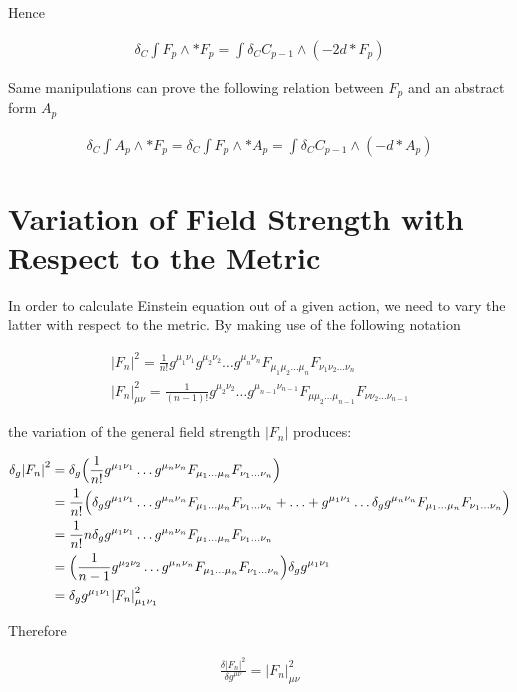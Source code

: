\documentclass[a4paper,notitlepage]{report}
\begin{document}
\vspace{0.5em}
Hence

\begin{align}
\delta_C \int F_p \wedge *F_p = \int \delta_C C_{p-1} \wedge (- 2 d * F_p) 
\end{align}

\vspace{0.5em}
Same manipulations can prove the following relation between $F_p$ and an abstract form $A_p$
 
\begin{align}
\delta_C \int A_p \wedge *F_p = \delta_C \int F_p \wedge *A_p = \int \delta_C C_{p-1} \wedge (-d * A_p) 
\end{align}

\clearpage

\section{Variation of Field Strength with Respect to the Metric} \label{ABC3}

In order to calculate Einstein equation out of a given action, we need to vary the latter with respect to the metric. By making use of the following notation

\begin{gather}
{|{F}_{n}|}^2 = \frac{1}{n!} g^{\mu_{1}\nu_{1}} g^{\mu_{2}\nu_{2}} \ldots g^{\mu_{n}\nu_{n}} {F}_{\mu_{1} \mu_{2} \ldots \mu_{n}} {F}_{\nu_{1} \nu_{2} \ldots \nu_{n}} \\
{|{F}_{n}|}^2_{\mu\nu} =  \frac{1}{(n-1)!} g^{\mu_{2}\nu_{2}} \ldots g^{\mu_{n-1}\nu_{n-1}} {F}_{\mu \mu_{2} \ldots \mu_{n-1}} {F}_{\nu \nu_{2} \ldots \nu_{n-1}}
\end{gather}

the variation of the general field strength $|F_{n}|$ produces:

\begin{align}
\delta_g {|{F}_{n}|}^2 &= \delta_g \Big( \frac{1}{n!} g^{\mu_{1}\nu_{1}} \ldots g^{\mu_{n}\nu_{n}} F_{\mu_{1} \ldots \mu_{n}} F_{\nu_{1} \ldots \nu_{n}} \Big) \notag \\
&= \frac{1}{n!} \Big( \delta_g g^{\mu_{1}\nu_{1}} \ldots g^{\mu_{n}\nu_{n}} F_{\mu_{1} \ldots \mu_{n}} F_{\nu_{1} \ldots \nu_{n}} + \ldots + g^{\mu_{1}\nu_{1}} \ldots \delta_g  g^{\mu_{n}\nu_{n}} F_{\mu_{1} \ldots \mu_{n}} F_{\nu_{1} \ldots \nu_{n}}  \Big) \notag\\
&= \frac{1}{n!} n \delta_g g^{\mu_{1}\nu_{1}} \ldots g^{\mu_{n}\nu_{n}} F_{\mu_{1} \ldots \mu_{n}} F_{\nu_{1} \ldots \nu_{n}} \notag\\
&= \Big( \frac{1}{n-1} g^{\mu_{2}\nu_{2}}  \ldots g^{\mu_{n}\nu_{n}} F_{\mu_{1} \ldots \mu_{n}} F_{\nu_{1} \ldots \nu_{n}} \Big) \delta_g g^{\mu_{1}\nu_{1}} \notag\\
& = \delta_g g^{\mu_{1}\nu_{1}} {|{F}_{n}|}^2_{\mu_{1}\nu_{1}} \notag
\end{align}

\vspace{0.5em}
Therefore

\begin{align} \label{metric}
\frac{\delta {|{F}_{n}|}^2}{\delta g^{\mu \nu}} = {|{F}_{n}|}^2_{\mu\nu} 
\end{align}



\end{document}
